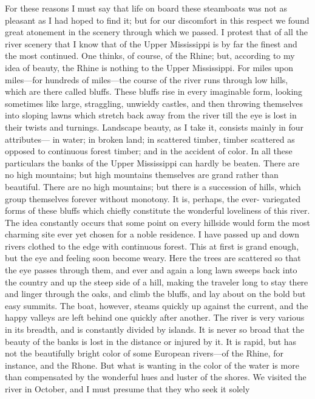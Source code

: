 For these reasons I must say that life on board these steamboats
was not as pleasant as I had hoped to find it; but for our
discomfort in this respect we found great atonement in the scenery
through which we passed.  I protest that of all the river scenery
that I know that of the Upper Mississippi is by far the finest and
the most continued.  One thinks, of course, of the Rhine; but,
according to my idea of beauty, the Rhine is nothing to the Upper
Mississippi.  For miles upon miles---for hundreds of miles---the
course of the river runs through low hills, which are there called
bluffs.  These bluffs rise in every imaginable form, looking
sometimes like large, straggling, unwieldy castles, and then
throwing themselves into sloping lawns which stretch back away from
the river till the eye is lost in their twists and turnings.
Landscape beauty, as I take it, consists mainly in four attributes---%
in water; in broken land; in scattered timber, timber scattered as
opposed to continuous forest timber; and in the accident of color.
In all these particulars the banks of the Upper Mississippi can
hardly be beaten.  There are no high mountains; but high mountains
themselves are grand rather than beautiful.  There are no high
mountains; but there is a succession of hills, which group
themselves forever without monotony.  It is, perhaps, the ever-
variegated forms of these bluffs which chiefly constitute the
wonderful loveliness of this river.  The idea constantly occurs
that some point on every hillside would form the most charming site
ever yet chosen for a noble residence.  I have passed up and down
rivers clothed to the edge with continuous forest.  This at first
is grand enough, but the eye and feeling soon become weary.  Here
the trees are scattered so that the eye passes through them, and
ever and again a long lawn sweeps back into the country and up the
steep side of a hill, making the traveler long to stay there and
linger through the oaks, and climb the bluffs, and lay about on the
bold but easy summits.  The boat, however, steams quickly up
against the current, and the happy valleys are left behind one
quickly after another.  The river is very various in its breadth,
and is constantly divided by islands.  It is never so broad that
the beauty of the banks is lost in the distance or injured by it.
It is rapid, but has not the beautifully bright color of some
European rivers---of the Rhine, for instance, and the Rhone.  But
what is wanting in the color of the water is more than compensated
by the wonderful hues and luster of the shores.  We visited the
river in October, and I must presume that they who seek it solely
